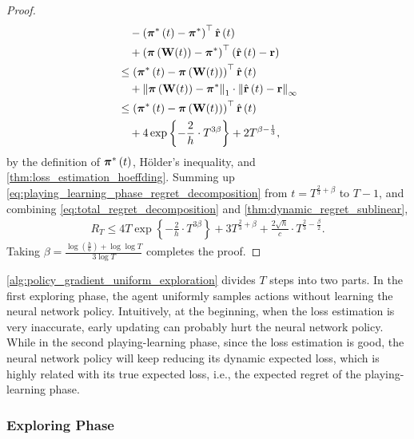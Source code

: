 \begin{proof}
\begin{equation}
\begin{split}
    &\quad - \left( {{\boldsymbol{\pi}}^*\left(t\right)} - {{\boldsymbol{\pi}}^*} \right)^\top \hat{{\mathbf{r}}}\left(t\right) \\
    &\quad + \left( {\boldsymbol{\pi}}\left( {\mathbf{W}}(t) \right) - {{\boldsymbol{\pi}}^*}\right)^\top \left( \hat{{\mathbf{r}}}\left(t\right) - {\mathbf{r}} \right) \\
    &\le \left( {{\boldsymbol{\pi}}^*\left(t\right)} - {\boldsymbol{\pi}}\left( {\mathbf{W}}(t) \right) \right)^\top \hat{{\mathbf{r}}}\left(t\right) \\
    &\quad + \left\| {\boldsymbol{\pi}}\left( {\mathbf{W}}(t) \right) - {\boldsymbol{\pi}}^* \right\|_1 \cdot \left\| \hat{{\mathbf{r}}}\left(t\right) - {\mathbf{r}} \right\|_\infty  \\
    &\le \left( {{\boldsymbol{\pi}}^*\left(t\right)} - {\boldsymbol{\pi}}\left( {\mathbf{W}}(t) \right) \right)^\top \hat{{\mathbf{r}}}\left(t\right) \\
    &\quad + 4 \exp\left\{ - \frac{2}{h} \cdot  T^{3\beta} \right\} + 2 T^{\beta - \frac{1}{3}},
\end{split}
\end{equation}
by the definition of ${\boldsymbol{\pi}}^*\left(t\right)$, H{\"o}lder's inequality, and \cref{thm:loss_estimation_hoeffding}. Summing up \cref{eq:playing_learning_phase_regret_decomposition} from $t = T^{\frac{2}{3} + \beta}$ to $T - 1$, and
combining \cref{eq:total_regret_decomposition} and \cref{thm:dynamic_regret_sublinear},
\begin{equation*}
\begin{split}
    R_T \le  4 T \exp\left\{ - \frac{2}{h} \cdot  T^{3\beta} \right\} + 3 T^{\frac{2}{3} + \beta} + \frac{2 \sqrt{h}}{ c} \cdot T^{\frac{2}{3} - \frac{\beta}{2}}.
\end{split}
\end{equation*}
Taking $\beta = \frac{ \log{\left(\frac{h}{6}\right) + \log{\log{T}} } }{ 3 \log{T}} $ completes the proof.
\end{proof}

\cref{alg:policy_gradient_uniform_exploration} divides $T$ steps into two parts. In the first exploring phase, the agent uniformly samples actions without learning the neural network policy. Intuitively, at the beginning, when the loss estimation is very inaccurate, early updating can probably hurt the neural network policy.  While in the second playing-learning phase, since the loss estimation is good, the neural network policy will keep reducing its dynamic expected loss, which is highly related with its true expected loss, i.e., the expected regret of the playing-learning phase.

\subsubsection{Exploring Phase}
\label{subsubsec:exploring_phase}

